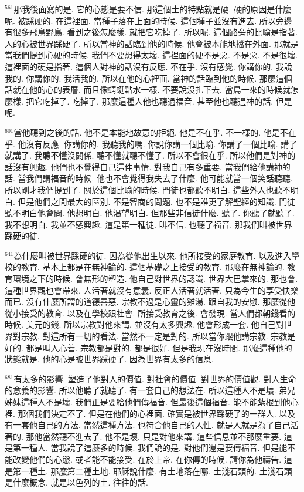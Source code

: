 \documentclass{book}
\begin{document}
$^{561}$那我後面寫的是.
它的心態是要不信.
那這個土的特點就是硬.
硬的原因是什麼呢.
被踩硬的.
在這裡面.
當種子落在上面的時候.
這個種子並沒有進去.
所以旁邊有很多飛鳥野鳥.
看到之後怎麼樣.
就把它吃掉了.
所以呢.
這個路旁的比喻是指著.
人的心被世界踩硬了.
所以當神的話臨到他的時候.
他會被本能地擋在外面.
那就是當我們提到心硬的時候.
我們不要想得太壞.
這裡面的硬不是惡.
不是惡.
不是很壞.
這裡面的硬是指著.
這個人對神的話沒有反應.
不在乎.
沒有感覺.
你講你的.
我說我的.
你講你的.
我活我的.
所以在他的心裡面.
當神的話臨到他的時候.
那麼這個話就在他的心的表層.
而且像蜻蜓點水一樣.
不要說沒扎下去.
當鳥一來的時候就怎麼樣.
把它吃掉了.
吃掉了.
那麼這種人他也聽過福音.
甚至他也聽過神的話.
但是呢.

$^{601}$當他聽到之後的話.
他不是本能地故意的拒絕.
他是不在乎.
不一樣的.
他是不在乎.
他沒有反應.
你講你的.
我聽我的嗎.
你說你講一個比喻.
你講了一個比喻.
講了就講了.
我聽不懂沒關係.
聽不懂就聽不懂了.
所以不會很在乎.
所以他們是對神的話沒有興趣.
他們也不覺得自己這件事情.
對我自己有多重要.
當我們給他講神的話.
當我們講福音的時候.
他也不會覺得我失去了什麼.
他可能就當一個笑話聽聽.
所以剛才我們提到了.
關於這個比喻的時候.
門徒也都聽不明白.
這些外人也聽不明白.
但是他們之間最大的區別.
不是智商的問題.
也不是誰更了解聖經的知識.
門徒聽不明白他會問.
他想明白.
他渴望明白.
但那些非信徒什麼.
聽了.
你聽了就聽了.
我不想明白.
我並不感興趣.
這是第一種徒.
叫不信.
也聽了福音.
那我們叫被世界踩硬的徒.

$^{641}$為什麼叫被世界踩硬的徒.
因為從他出生以來.
他所接受的家庭教育.
以及進入學校的教育.
基本上都是在無神論的.
這個基礎之上接受的教育.
那麼在無神論的.
教育環境之下的時候.
會無形的塑造.
他自己對世界的認識.
世界大巴掌來的.
那也會.
這種世界觀也會帶來.
人活著就沒有意義.
反正人活著就活著.
只為今生的享受快樂而已.
沒有什麼所謂的道德善惡.
宗教不過是心靈的雞湯.
跟自我的安慰.
那麼從他從小接受的教育.
以及在學校跟社會.
所接受教育之後.
會發現.
當人們都朝錢看的時候.
美元的錢.
所以宗教對他來講.
並沒有太多興趣.
他會形成一套.
他自己對世界對宗教.
對這所有一切的看法.
當然不一定是對的.
所以當你跟他講宗教.
宗教是好的.
都是叫人心善.
宗教都是對的.
都是很好.
但是我現在沒時間.
那麼這種他的狀態就是.
他的心是被世界踩硬了.
因為世界有太多的信息.

$^{681}$有太多的影響.
塑造了他對人的價值.
對社會的價值.
對世界的價值觀.
對人生命的意義的影響.
所以他聽了就聽了.
有一套自己的想法在.
所以這種人不是壞.
弟兄姊妹這種人不是壞.
我們正是要給他們傳福音.
但最後這個福音.
能不能紮根到他心裡.
那個我們決定不了.
但是在他們的心裡面.
確實是被世界踩硬了的一群人.
以及有一套他自己的方法.
當然這種方法.
也符合他自己的人性.
就是人就是為了自己活著的.
那他當然聽不進去了.
他不是壞.
只是對他來講.
這些信息並不那麼重要.
這是第一種人.
當我說了這麼多的時候.
我們說的是.
對他們還是要傳福音.
但是能不能改變他們的心態.
或者能不能接受.
在於上帝.
在你傳的時候.
請你為他禱告.
這是第一種土.
那麼第二種土地.
耶穌說什麼.
有土地落在哪.
土淺石頭的.
土淺石頭是什麼概念.
就是以色列的土.
往往的話.
\end{document}
